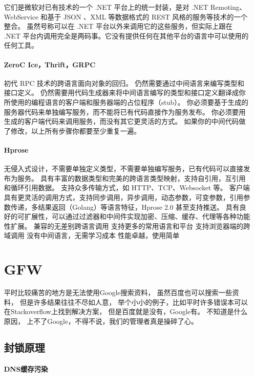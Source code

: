 \documentclass{book}
\begin{document}
它们是微软对已有技术的一个 .NET 平台上的统一封装，是对 .NET Remoting、WebService 和基于 JSON 、XML 等数据格式的 REST 风格的服务等技术的一个整合。
虽然号称可以在 .NET 平台以外来调用它的这些服务，但实际上跟在 .NET 平台内调用完全是两码事。它没有提供任何在其他平台的语言中可以使用的任何工具。

\paragraph{ZeroC Ice，Thrift，GRPC}

初代 RPC 技术的跨语言面向对象的回归。
仍然需要通过中间语言来编写类型和接口定义。
仍然需要用代码生成器来将中间语言编写的类型和接口定义翻译成你所使用的编程语言的客户端和服务器端的占位程序（stub）。
你必须要基于生成的服务器代码来单独编写服务，而不能将已有代码直接作为服务发布。
你必须要用生成的客户端代码来调用服务，而没有其它更灵活的方式。
如果你的中间代码做了修改，以上所有步骤你都要至少重复一遍。

\paragraph{Hprose}

无侵入式设计，不需要单独定义类型，不需要单独编写服务，已有代码可以直接发布为服务。
具有丰富的数据类型和完美的跨语言类型映射，支持自引用，互引用和循环引用数据。
支持众多传输方式，如 HTTP、TCP、Websocket 等。
客户端具有更灵活的调用方式，支持同步调用，异步调用，动态参数，可变参数，引用参数传递，多结果返回（Golang）等语言特征，Hprose 2.0 甚至支持推送。
具有良好的可扩展性，可以通过过滤器和中间件实现加密、压缩、缓存、代理等各种功能性扩展。
兼容的无差别跨语言调用
支持更多的常用语言和平台
支持浏览器端的跨域调用
没有中间语言，无需学习成本
性能卓越，使用简单

\section{GFW}

平时比较痛苦的地方是无法使用Google搜索资料，
虽然百度也可以搜索一些资料，
但是许多结果往往不尽如人意，
举个小小的例子，比如平时许多错误本可以在Stackoverflow上找到解决方案，
但是百度就是没有，Google有。
不知道是什么原因，
上不了Google，不得不说，我们的管理者真是操碎了心。

\subsection{封锁原理}

\paragraph{DNS缓存污染}
\end{document}
